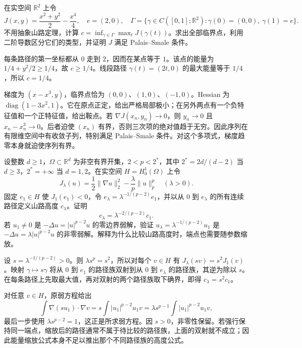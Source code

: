 \begin{optionalexercise}[一个可以直接计算的山口]\label{b2:ex:14-mountain-finite}
在实空间 \(\mathbb R^2\) 上令
\[
 J(x,y)=\frac{x^2+y^2}{2}-\frac{x^4}{4},
 \quad e=(2,0),
 \quad\Gamma=\{\gamma\in C([0,1];\mathbb R^2):\gamma(0)=(0,0),\ \gamma(1)=e\}.
\]
不用抽象山路定理，计算 \(c=\inf_{\gamma\in\Gamma}\max_tJ(\gamma(t))\)。求出全部临界点，利用二阶导数区分它们的类型，并证明 \(J\) 满足 Palais–Smale 条件。
\end{optionalexercise}
\begin{solution}
每条路径的第一坐标都从 \(0\) 走到 \(2\)，因而在某点等于 \(1\)。该点的能量为 \(1/4+y^2/2\ge1/4\)，故 \(c\ge1/4\)。线段路径 \(\gamma(t)=(2t,0)\) 的最大能量等于 \(1/4\)，所以 \(c=1/4\)。

梯度为 \((x-x^3,y)\)，临界点恰为 \((0,0)\)、\((1,0)\)、\((-1,0)\)。Hessian 为 \(\operatorname{diag}(1-3x^2,1)\)。它在原点正定，给出严格局部极小；在另外两点有一个负特征值和一个正特征值，给出鞍点。若 \(\nabla J(x_n,y_n)\to0\)，则 \(y_n\to0\) 且 \(x_n-x_n^3\to0\)。后者迫使 \((x_n)\) 有界，否则三次项的绝对值趋于无穷。因此序列在有限维空间中有收敛子列，特别满足 Palais–Smale 条件。对这个多项式，梯度趋零本身就迫使序列有界。
\end{solution}

\begin{optionalexercise}[非线性强度与山路高度]\label{b2:ex:14-mountain-scaling}
设整数 \(d\ge1\)，\(\Omega\subset\mathbb R^d\) 为非空有界开集，\(2<p<2^*\)，其中 \(2^*=2d/(d-2)\) 当 \(d\ge3\)，\(2^*=+\infty\) 当 \(d=1,2\)。在实空间 \(H=H_0^1(\Omega)\) 上令
\[
 J_\lambda(u)=\frac12\|\nabla u\|_2^2-\frac\lambda p\|u\|_p^p
 \quad(\lambda>0).
\]
固定 \(e_1\in H\) 使 \(J_1(e_1)<0\)，令 \(e_\lambda=\lambda^{-1/(p-2)}e_1\)，并以从 \(0\) 到 \(e_\lambda\) 的所有连续路径定义山路高度 \(c_\lambda\)。证明
\[
 c_\lambda=\lambda^{-2/(p-2)}c_1.
\]
若 \(u_1\ne0\) 是 \(-\Delta u=|u|^{p-2}u\) 的零边界弱解，验证 \(u_\lambda=\lambda^{-1/(p-2)}u_1\) 是 \(-\Delta u=\lambda|u|^{p-2}u\) 的非零弱解。解释为什么比较山路高度时，端点也需要随参数缩放。
\end{optionalexercise}
\begin{solution}
设 \(s=\lambda^{-1/(p-2)}>0\)。则 \(\lambda s^p=s^2\)，所以对每个 \(v\in H\) 有 \(J_\lambda(sv)=s^2J_1(v)\)。映射 \(\gamma\mapsto s\gamma\) 将从 \(0\) 到 \(e_1\) 的路径族双射到从 \(0\) 到 \(e_\lambda\) 的路径族，其逆为除以 \(s\)。在每条路径上先取最大值，再对双射的两个路径族取下确界，即得 \(c_\lambda=s^2c_1\)。

对任意 \(v\in H\)，原弱方程给出
\[
 \int\nabla(su_1)\cdot\nabla v
 =s\int|u_1|^{p-2}u_1v
 =\lambda s^{p-1}\int|u_1|^{p-2}u_1v,
\]
最后一步使用 \(\lambda s^{p-2}=1\)，这正是所求弱方程。因 \(s>0\)，非零性保留。若强行保持同一端点，缩放后的路径通常不属于待比较的路径族，上面的双射就不成立；因此能量缩放公式本身不足以推出那个不同路径族的高度公式。
\end{solution}
